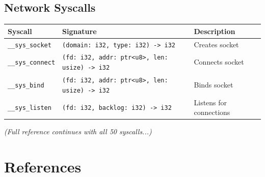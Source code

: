 \documentclass[12pt,a4paper]{article}
\theoremstyle{definition}
\begin{document}
\subsection{Network Syscalls}

\begin{tabular}{|l|l|p{5.5cm}|}
\hline
\textbf{Syscall} & \textbf{Signature} & \textbf{Description} \\
\hline
\texttt{\_\_sys\_socket} & \texttt{(domain: i32, type: i32) -> i32} & Creates socket \\
\texttt{\_\_sys\_connect} & \texttt{(fd: i32, addr: ptr<u8>, len: usize) -> i32} & Connects socket \\
\texttt{\_\_sys\_bind} & \texttt{(fd: i32, addr: ptr<u8>, len: usize) -> i32} & Binds socket \\
\texttt{\_\_sys\_listen} & \texttt{(fd: i32, backlog: i32) -> i32} & Listens for connections \\
\hline
\end{tabular}

\textit{(Full reference continues with all 50 syscalls...)}

\newpage

\section*{References}
\end{document}

